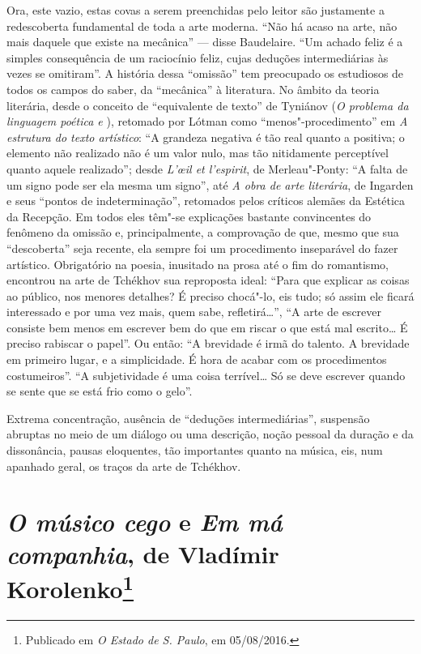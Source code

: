 {{Ora, este vazio, estas covas a serem preenchidas pelo leitor são
justamente a redescoberta fundamental de toda a arte moderna. ``Não há
acaso na arte, não mais daquele que existe na mecânica'' --- disse
Baudelaire. ``Um achado feliz é a simples consequência de um raciocínio
feliz, cujas deduções intermediárias às vezes se omitiram''. A história
dessa ``omissão'' tem preocupado os estudiosos de todos os campos do
saber, da ``mecânica'' à literatura. No âmbito da teoria literária,
desde o conceito de ``equivalente de texto'' de Tyniánov (\emph{O
problema da linguagem poética  e }), retomado por Lótman como
``menos"-procedimento'' em \emph{A estrutura do texto artístico}: ``A
grandeza negativa é tão real quanto a positiva; o elemento não realizado
não é um valor nulo, mas tão nitidamente perceptível quanto aquele
realizado''; desde \emph{L'œil et l'espirit}, de Merleau"-Ponty: ``A
falta de um signo pode ser ela mesma um signo'', até \emph{A obra de
arte literária}, de Ingarden e seus ``pontos de indeterminação'',
retomados pelos críticos alemães da Estética da Recepção. Em todos eles têm"-se
explicações bastante convincentes do fenômeno da omissão e, principalmente, a
comprovação de que, mesmo que sua ``descoberta'' seja recente, ela
sempre foi um procedimento inseparável do fazer artístico. Obrigatório
na poesia, inusitado na prosa até o fim do romantismo, encontrou na arte
de Tchékhov sua reproposta ideal: ``Para que explicar as coisas ao
público, nos menores detalhes? É preciso chocá"-lo, eis tudo; só assim
ele ficará interessado e por uma vez mais, quem sabe, refletirá\ldots{}'', ``A
arte de escrever consiste bem menos em escrever bem do que em riscar o
que está mal escrito\ldots{} É preciso rabiscar o papel''. Ou então: ``A
brevidade é irmã do talento. A brevidade em primeiro lugar, e a
simplicidade. É hora de acabar com os procedimentos costumeiros''. ``A
subjetividade é uma coisa terrível\ldots{} Só se deve escrever quando se
sente que se está frio como o gelo''.

Extrema concentração, ausência de ``deduções intermediárias'', suspensão
abruptas no meio de um diálogo ou uma descrição, noção pessoal da
duração e da dissonância, pausas eloquentes, tão importantes quanto na
música, eis, num apanhado geral, os traços da arte de Tchékhov.

\chapter{\emph{O músico cego} e \emph{Em má companhia}, de Vladímir
Korolenko\footnote{Publicado em \emph{O Estado de S. Paulo}, em
  05/08/2016.}}

}}
